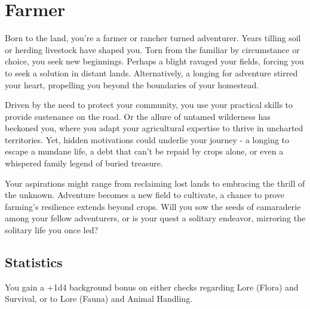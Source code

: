 \section{Farmer}\label{background:farmer}
Born to the land, you're a farmer or rancher turned adventurer.
Years tilling soil or herding livestock have shaped you.
Torn from the familiar by circumstance or choice, you seek new beginnings.
Perhaps a blight ravaged your fields, forcing you to seek a solution in distant lands.
Alternatively, a longing for adventure stirred your heart, propelling you beyond the boundaries of your homestead.

Driven by the need to protect your community, you use your practical skills to provide sustenance on the road.
Or the allure of untamed wilderness has beckoned you, where you adapt your agricultural expertise to thrive in uncharted territories.
Yet, hidden motivations could underlie your journey - a longing to escape a mundane life, a debt that can't be repaid by crops alone, or even a whispered family legend of buried treasure.

Your aspirations might range from reclaiming lost lands to embracing the thrill of the unknown.
Adventure becomes a new field to cultivate, a chance to prove farming's resilience extends beyond crops.
Will you sow the seeds of camaraderie among your fellow adventurers, or is your quest a solitary endeavor, mirroring the solitary life you once led?

\subsection{Statistics}
You gain a +1d4 background bonus on either checks regarding Lore (Flora) and Survival, or to Lore (Fauna) and Animal Handling.
